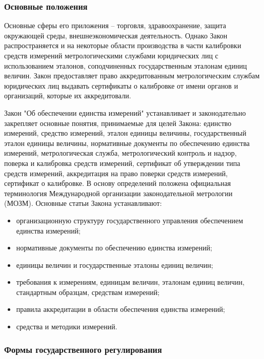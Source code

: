 \documentclass[14pt, a4paper] {ncc}
\begin{document}
	\subsubsection{Основные положения}

	Основные сферы его приложения -- торговля, здравоохранение, защита
	окружающей среды, внешнеэкономическая деятельность. Однако Закон распространяется и
	на некоторые области производства в части калибровки средств измерений
	метрологическими службами юридических лиц с использованием эталонов,
	соподчиненных государственным эталонам единиц величин. Закон предоставляет
	право аккредитованным метрологическим службам юридических лиц выдавать
	сертификаты о калибровке от имени органов и организаций, которые их
	аккредитовали.

    Закон "Об обеспечении единства измерений" устанавливает и законодательно
    закрепляет основные понятия, принимаемые для целей Закона: единство
    измерений, средство измерений, эталон единицы величины, государственный
    эталон единицы величины, нормативные документы по обеспечению единства
    измерений, метрологическая служба, метрологический контроль и надзор,
    поверка и калибровка средств измерений, сертификат об утверждении типа
    средств измерений, аккредитация на право поверки средств измерений,
    сертификат о калибровке. В основу определений положена официальная
    терминология Международной организации законодательной метрологии
    (МОЗМ). \cite{krilova}
    Основные статьи Закона устанавливают:
	\begin{itemize}
        \item организационную структуру государственного управления обеспечением единства измерений;
        \item нормативные документы по обеспечению единства измерений;
        \item единицы величин и государственные эталоны единиц величин;
		\item требования к измерениям, единицам величин, эталонам единиц величин, стандартным образцам, средствам измерений;
		\item правила аккредитации в области обеспечения единства измерений;
        \item средства и методики измерений.\cite{federal}
	\end{itemize}

	\subsubsection{Формы государственного регулирования}
\end{document}
